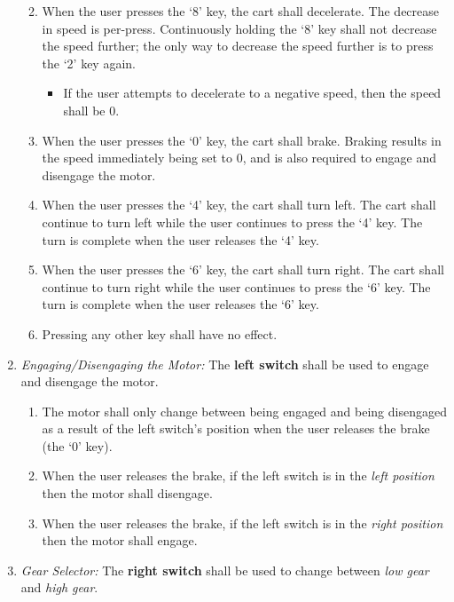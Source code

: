 \begin{enumerate}
\begin{enumerate}
\begin{itemize}
            \end{itemize}
        \item When the user presses the `8' key, the cart shall decelerate.
            The decrease in speed is per-press.
            Continuously holding the `8' key shall not decrease the speed further;
            the only way to decrease the speed further is to press the `2' key again.
            \begin{itemize}
                \item If the user attempts to decelerate to a negative speed, then the speed shall be 0.
            \end{itemize}
        \item When the user presses the `0' key, the cart shall brake.
            Braking results in the speed immediately being set to 0, and is also required to engage and disengage the motor.
        \item \label{spec:turnLeft} When the user presses the `4' key, the cart shall turn left.
            The cart shall continue to turn left while the user continues to press the `4' key.
            The turn is complete when the user releases the `4' key.
        \item \label{spec:turnRight} When the user presses the `6' key, the cart shall turn right.
            The cart shall continue to turn right while the user continues to press the `6' key.
            The turn is complete when the user releases the `6' key.
        \item Pressing any other key shall have no effect.
    \end{enumerate}
    \item \textit{Engaging/Disengaging the Motor:} The \textbf{left switch} shall be used to engage and disengage the motor.
        \begin{enumerate}
            \item The motor shall only change between being engaged and being disengaged as a result of the left switch's position when the user releases the brake (the `0' key).
            \item When the user releases the brake, if the left switch is in the \textit{left position} then the motor shall disengage.
            \item When the user releases the brake, if the left switch is in the \textit{right position} then the motor shall engage.
        \end{enumerate}
    \item \textit{Gear Selector:} The \textbf{right switch} shall be used to change between \textit{low gear} and \textit{high gear}.

\end{enumerate}
